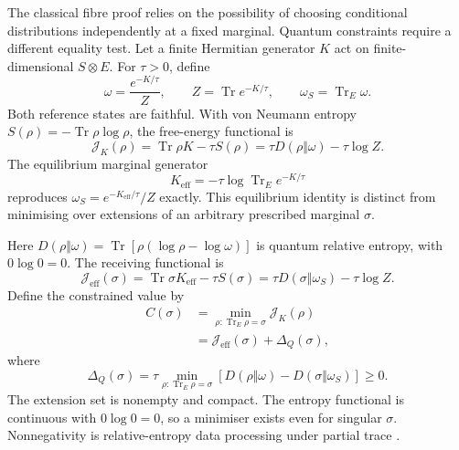 The classical fibre proof relies on the possibility of choosing conditional distributions independently at a fixed marginal. Quantum constraints require a different equality test. Let a finite Hermitian generator \(K\) act on finite-dimensional \(S\otimes E\). For \(\tau>0\), define
\[
 \omega=\frac{e^{-K/\tau}}{Z},\qquad
 Z=\operatorname{Tr}e^{-K/\tau},\qquad
 \omega_S=\operatorname{Tr}_E\omega .
\]
Both reference states are faithful. With von Neumann entropy
\(S(\rho)=-\operatorname{Tr}\rho\log\rho\), the free-energy functional is
\begin{equation}
 \mathcal J_K(\rho)=\operatorname{Tr}\rho K-\tau S(\rho)
       =\tau D(\rho\Vert\omega)-\tau\log Z .
 \label{eq:quantum-free-energy}
\end{equation}
The equilibrium marginal generator
\[
 K_{\mathrm{eff}}=-\tau\log\operatorname{Tr}_Ee^{-K/\tau}
\]
reproduces \(\omega_S=e^{-K_{\mathrm{eff}}/\tau}/Z\) exactly. This equilibrium identity is distinct from minimising over extensions of an arbitrary prescribed marginal \(\sigma\).

Here \(D(\rho\Vert\omega)=\operatorname{Tr}[\rho(\log\rho-\log\omega)]\) is quantum relative entropy, with \(0\log0=0\). The receiving functional is
\[
 \mathcal J_{\mathrm{eff}}(\sigma)
 =\operatorname{Tr}\sigma K_{\mathrm{eff}}-\tau S(\sigma)
 =\tau D(\sigma\Vert\omega_S)-\tau\log Z .
\]
Define the constrained value by
\begin{align}
 C(\sigma)&=\min_{\rho:\operatorname{Tr}_E\rho=\sigma}
                         \mathcal J_K(\rho)\nonumber\\
 &=\mathcal J_{\mathrm{eff}}(\sigma)+\Delta_Q(\sigma),
 \label{eq:quantum-contraction}
\end{align}
where
\begin{equation}
 \Delta_Q(\sigma)=
 \tau\min_{\rho:\operatorname{Tr}_E\rho=\sigma}
 [D(\rho\Vert\omega)-D(\sigma\Vert\omega_S)]\geq0 .
 \label{eq:quantum-gap}
\end{equation}
The extension set is nonempty and compact. The entropy functional is continuous with \(0\log0=0\), so a minimiser exists even for singular \(\sigma\). Nonnegativity is relative-entropy data processing under partial trace \cite{PETZ200347a4ef,Junge20189e4744}.

